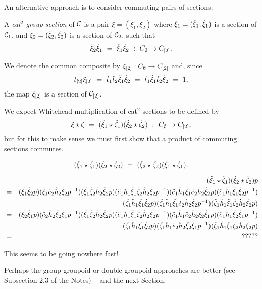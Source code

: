 \bigskip
An alternative approach is to consider commuting pairs of sections.

\begin{defn}
A \emph{cat$^2$-group section} of $\mathcal{C}$ is a pair 
$\xi = (\xi_1,\xi_2)$ 
where $\xi_1 = (\ddot{\xi}_1,\dot{\xi}_1)$ is a section of $\mathcal{C}_1$, 
and $\xi_2 = (\ddot{\xi}_2,\dot{\xi}_2)$ is a section of $\mathcal{C}_2$, such that 
$$
\ddot{\xi}_2\dot{\xi}_1 ~=~ \ddot{\xi}_1\dot{\xi}_2 ~:~ C_{\emptyset} \to C_{[2]}.
$$
\end{defn}

We denote the common composite by $\xi_{[2]} : C_{\emptyset} \to C_{[2]}$ 
and, since
$$
t_{[2]}\xi_{[2]} ~=~ \dot{t}_1\ddot{t}_2\ddot{\xi}_1\dot{\xi}_2 ~=~ \dot{t}_1\dot{\xi}_1\dot{t}_2\dot{\xi}_2 ~=~ 1,
$$
the map $\xi_{[2]}$ is a section of $\mathcal{C}_{[2]}$.

\bigskip
We expect Whitehead multiplication of cat$^2$-sections to be defined by 
$$
\xi\star\zeta ~=~ (\ddot{\xi}_1\star\ddot{\zeta}_1)(\dot{\xi}_2\star\dot{\zeta}_2)
~:~ C_{\emptyset} \to C_{[2]},
$$
but for this to make sense we must first show that a 
product of commuting sections commutes.

\begin{lem}
$$
(\ddot{\xi}_1\star\ddot{\zeta}_1)(\dot{\xi}_2\star\dot{\zeta}_2) ~=~ (\ddot{\xi}_2\star\ddot{\zeta}_2)(\dot{\xi}_1\star\dot{\zeta}_1).
$$
\end{lem}
\begin{pf}
\begin{eqnarray*}
&   &  (\ddot{\xi}_1\star\ddot{\zeta}_1)(\dot{\xi}_2\star\dot{\zeta}_2)p \\
& = &  (\ddot{\xi}_1\dot{\xi}_2 p)(\ddot{\xi}_1\dot{e}_2\dot{h}_2\dot{\xi}_2 p^{-1})(\ddot{\xi}_1\dot{\zeta}_2\dot{h}_2\dot{\xi}_2 p)
       (\ddot{e}_1\ddot{h}_1\ddot{\xi}_1\dot{\zeta}_2\dot{h}_2\dot{\xi}_2 p^{-1})
       (\ddot{e}_1\ddot{h}_1\ddot{\xi}_1\dot{e}_2\dot{h}_2\dot{\xi}_2 p)(\ddot{e}_1\ddot{h}_1\ddot{\xi}_1\dot{\xi}_2 p^{-1})\\
&   &  \qquad(\ddot{\zeta}_1\ddot{h}_1\ddot{\xi}_1\dot{\xi}_2 p)(\ddot{\zeta}_1\ddot{h}_1\ddot{\xi}_1\dot{e}_2\dot{h}_2\dot{\xi}_2 p^{-1})
       (\ddot{\zeta}_1\ddot{h}_1\ddot{\xi}_1\dot{\zeta}_2\dot{h}_2\dot{\xi}_2 p)\\
& = &  (\ddot{\xi}_2\dot{\xi}_1 p)(\ddot{e}_2\ddot{h}_2\ddot{\xi}_2\dot{\xi}_1 p^{-1})(\ddot{\xi}_1\dot{\zeta}_2\dot{h}_2\dot{\xi}_2 p)
       (\ddot{e}_1\ddot{h}_1\ddot{\xi}_1\dot{\zeta}_2\dot{h}_2\dot{\xi}_2 p^{-1})
       (\ddot{e}_1\ddot{h}_1\ddot{e}_2\ddot{h}_2\ddot{\xi}_2\dot{\xi}_1 p)(\ddot{e}_1\ddot{h}_1\ddot{\xi}_2\dot{\xi}_1 p^{-1})\\
&   &  \qquad(\ddot{\zeta}_1\ddot{h}_1\ddot{\xi}_1\dot{\xi}_2 p)(\ddot{\zeta}_1\ddot{h}_1\ddot{e}_2\ddot{h}_2\ddot{\xi}_2\dot{\xi}_1 p^{-1})
       (\ddot{\zeta}_1\ddot{h}_1\ddot{\xi}_1\dot{\zeta}_2\dot{h}_2\dot{\xi}_2 p)\\
& = & ?????
\end{eqnarray*}

\noindent
This seems to be going nowhere fast!

\noindent
Perhaps the group-groupoid or double groupoid approaches are better 
(see Subsection 2.3 of the Notes)  -- and the next Section.
\end{pf}


